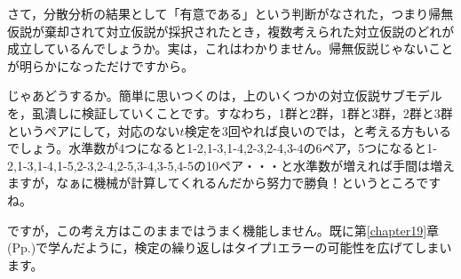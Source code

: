 \documentclass{ltjbook}
\begin{document}
さて，分散分析の結果として「有意である」という判断がなされた，つまり帰無仮説が棄却されて対立仮説が採択されたとき，複数考えられた対立仮説のどれが成立しているんでしょうか。実は，これはわかりません。帰無仮説じゃないことが明らかになっただけですから。

じゃあどうするか。簡単に思いつくのは，上のいくつかの対立仮説サブモデルを，虱潰しに検証していくことです。すなわち，1群と2群，1群と3群，2群と3群というペアにして，対応のない$t$検定を3回やれば良いのでは，と考える方もいるでしょう。水準数が4つになると1-2,1-3,1-4,2-3,2-4,3-4の6ペア，5つになると1-2,1-3,1-4,1-5,2-3,2-4,2-5,3-4,3-5,4-5の10ペア・・・と水準数が増えれば手間は増えますが，なぁに機械が計算してくれるんだから努力で勝負！というところですね。

ですが，この考え方はこのままではうまく機能しません。既に第\ref{chapter19}章(Pp.\pageref{alphaInfration})で学んだように，検定の繰り返しはタイプ1エラーの可能性を広げてしまいます。

\end{document}
